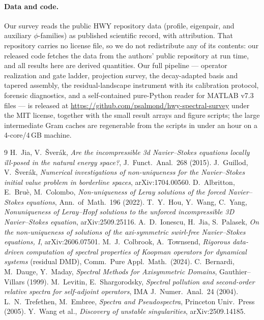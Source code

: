 \documentclass[11pt]{article}
\theoremstyle{plain}
\theoremstyle{remark}
\begin{document}
\paragraph{Data and code.} Our survey reads the public HWY repository
data (profile, eigenpair, and auxiliary $\phi$-families) as published
scientific record, with attribution. That repository carries no license
file, so we do not redistribute any of its contents: our released code
fetches the data from the authors' public repository at run time, and
all results here are derived quantities. Our full pipeline --- operator
realization and gate ladder, projection survey, the decay-adapted basis
and tapered assembly, the residual-landscape instrument with its
calibration protocol, forensic diagnostics, and a self-contained
pure-Python reader for MATLAB v7.3 files --- is released at
\url{https://github.com/psalmond/hwy-spectral-survey} under the MIT
license, together with the small result arrays and figure scripts;
the large intermediate Gram caches are regenerable from the scripts in
under an hour on a 4-core/4\,GB machine.

\begin{thebibliography}{9}
 H.~Jia, V.~\v{S}ver\'ak, \emph{Are the incompressible 3d
Navier--Stokes equations locally ill-posed in the natural energy space?},
J.~Funct.~Anal.~268 (2015).
 J.~Guillod, V.~\v{S}ver\'ak, \emph{Numerical
investigations of non-uniqueness for the Navier--Stokes initial value
problem in borderline spaces}, arXiv:1704.00560.
 D.~Albritton, E.~Bru\`e, M.~Colombo, \emph{Non-uniqueness
of Leray solutions of the forced Navier--Stokes equations},
Ann.~of~Math.~196 (2022).
 T.~Y.~Hou, Y.~Wang, C.~Yang, \emph{Nonuniqueness of
Leray--Hopf solutions to the unforced incompressible 3D Navier--Stokes
equation}, arXiv:2509.25116.
 A.~D.~Ionescu, H.~Jia, S.~Palasek, \emph{On the
non-uniqueness of solutions of the axi-symmetric swirl-free
Navier--Stokes equations, I}, arXiv:2606.07501.
 M.~J.~Colbrook, A.~Townsend, \emph{Rigorous
data-driven computation of spectral properties of Koopman operators for
dynamical systems} (residual DMD), Comm.~Pure Appl.~Math.~(2024).
 C.~Bernardi, M.~Dauge, Y.~Maday, \emph{Spectral Methods
for Axisymmetric Domains}, Gauthier--Villars (1999).
 M.~Levitin, E.~Shargorodsky, \emph{Spectral pollution
and second-order relative spectra for self-adjoint operators}, IMA
J.~Numer.~Anal.~24 (2004).
 L.~N.~Trefethen, M.~Embree, \emph{Spectra and
Pseudospectra}, Princeton Univ.~Press (2005).
 Y.~Wang et al., \emph{Discovery of unstable
singularities}, arXiv:2509.14185.
\end{thebibliography}
\end{document}
